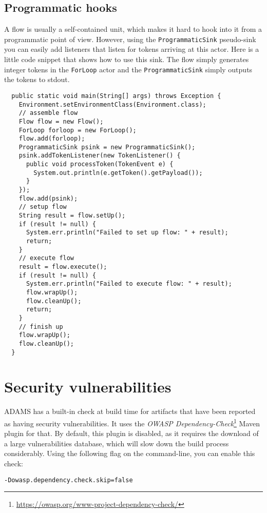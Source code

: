\section{Programmatic hooks}
A flow is usually a self-contained unit, which makes it hard to hook into it
from a programmatic point of view. However, using the \texttt{ProgrammaticSink}
pseudo-sink you can easily add listeners that listen for tokens arriving at
this actor.
Here is a little code snippet that shows how to use this sink. The flow simply
generates integer tokens in the \texttt{ForLoop} actor and the \texttt{ProgrammaticSink}
simply outputs the tokens to stdout.
\begin{verbatim}
  public static void main(String[] args) throws Exception {
    Environment.setEnvironmentClass(Environment.class);
    // assemble flow
    Flow flow = new Flow();
    ForLoop forloop = new ForLoop();
    flow.add(forloop);
    ProgrammaticSink psink = new ProgrammaticSink();
    psink.addTokenListener(new TokenListener() {
      public void processToken(TokenEvent e) {
        System.out.println(e.getToken().getPayload());
      }
    });
    flow.add(psink);
    // setup flow
    String result = flow.setUp();
    if (result != null) {
      System.err.println("Failed to set up flow: " + result);
      return;
    }
    // execute flow
    result = flow.execute();
    if (result != null) {
      System.err.println("Failed to execute flow: " + result);
      flow.wrapUp();
      flow.cleanUp();
      return;
    }
    // finish up
    flow.wrapUp();
    flow.cleanUp();
  }
\end{verbatim}


\chapter{Security vulnerabilities}
ADAMS has a built-in check at build time for artifacts that have been reported as having security vulnerabilities.
It uses the \textit{OWASP Dependency-Check}\footnote{\url{https://owasp.org/www-project-dependency-check/}{}}
Maven plugin for that. By default, this plugin is disabled, as it requires the download of a large vulnerabilities
database, which will slow down the build process considerably. Using the following flag on the command-line,
you can enable this check:

\begin{verbatim}
-Dowasp.dependency.check.skip=false
\end{verbatim}

